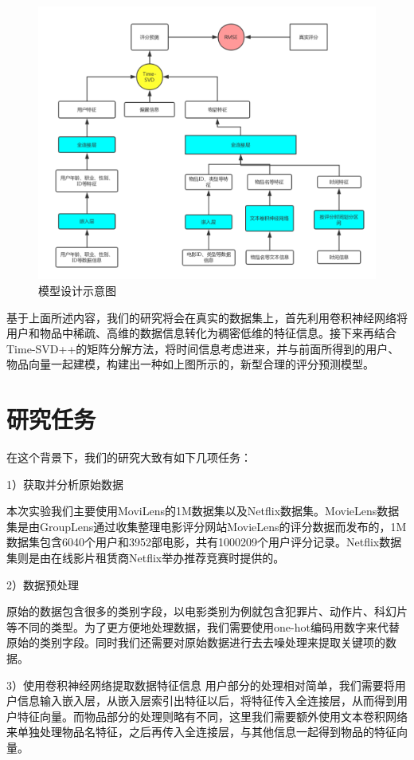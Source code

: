 \begin{figure}[htbp]
\centering
\includegraphics[width=0.8\linewidth]{images/myModel.pdf}
\caption{模型设计示意图}
\label{fig:fig1}
\end{figure}

基于上面所述内容，我们的研究将会在真实的数据集上，首先利用卷积神经网络将用户和物品中稀疏、高维的数据信息转化为稠密低维的特征信息。接下来再结合Time-SVD++的矩阵分解方法，将时间信息考虑进来，并与前面所得到的用户、物品向量一起建模，构建出一种如上图所示的，新型合理的评分预测模型。
\section{研究任务}
在这个背景下，我们的研究大致有如下几项任务：

1）获取并分析原始数据

本次实验我们主要使用MoviLens的1M数据集以及Netflix数据集。MovieLens数据集是由GroupLens通过收集整理电影评分网站MovieLens的评分数据而发布的，1M数据集包含6040个用户和3952部电影，共有1000209个用户评分记录。Netflix数据集则是由在线影片租赁商Netflix举办推荐竞赛时提供的。

2）数据预处理

原始的数据包含很多的类别字段，以电影类别为例就包含犯罪片、动作片、科幻片等不同的类型。为了更方便地处理数据，我们需要使用one-hot编码用数字来代替原始的类别字段。同时我们还需要对原始数据进行去去噪处理来提取关键项的数据。

3）使用卷积神经网络提取数据特征信息
用户部分的处理相对简单，我们需要将用户信息输入嵌入层，从嵌入层索引出特征以后，将特征传入全连接层，从而得到用户特征向量。而物品部分的处理则略有不同，这里我们需要额外使用文本卷积网络来单独处理物品名特征，之后再传入全连接层，与其他信息一起得到物品的特征向量。

